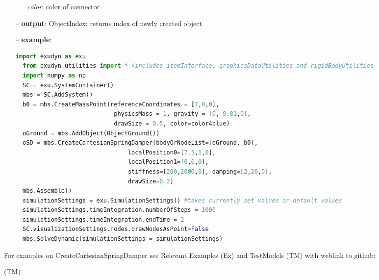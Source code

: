 \begin{itemize}[leftmargin=0.7cm]
\begin{itemize}[leftmargin=1.2cm]
\item[]{\it color}: color of connector
\end{itemize}
\item[--]
{\bf output}: ObjectIndex; returns index of newly created object
\item[--]
{\bf example}: \vspace{-12pt}\ei\begin{lstlisting}[language=Python, xleftmargin=36pt]
  import exudyn as exu
  from exudyn.utilities import * #includes itemInterface, graphicsDataUtilities and rigidBodyUtilities
  import numpy as np
  SC = exu.SystemContainer()
  mbs = SC.AddSystem()
  b0 = mbs.CreateMassPoint(referenceCoordinates = [7,0,0],
                            physicsMass = 1, gravity = [0,-9.81,0],
                            drawSize = 0.5, color=color4blue)
  oGround = mbs.AddObject(ObjectGround())
  oSD = mbs.CreateCartesianSpringDamper(bodyOrNodeList=[oGround, b0],
                                localPosition0=[7.5,1,0],
                                localPosition1=[0,0,0],
                                stiffness=[200,2000,0], damping=[2,20,0],
                                drawSize=0.2)
  mbs.Assemble()
  simulationSettings = exu.SimulationSettings() #takes currently set values or default values
  simulationSettings.timeIntegration.numberOfSteps = 1000
  simulationSettings.timeIntegration.endTime = 2
  SC.visualizationSettings.nodes.drawNodesAsPoint=False
  mbs.SolveDynamic(simulationSettings = simulationSettings)
\end{lstlisting}\vspace{-24pt}\bi\item[]\vspace{-24pt}\vspace{12pt}\end{itemize}
%

%
\noindent For examples on CreateCartesianSpringDamper see Relevant Examples (Ex) and TestModels (TM) with weblink to github:
\bi
 \item \footnotesize {} (TM)
\ei

